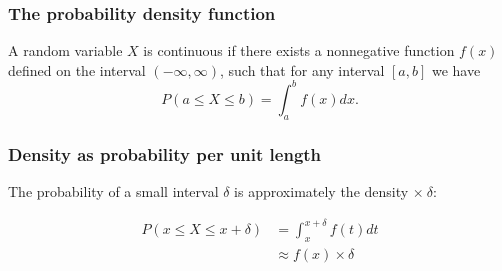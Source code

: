 \documentclass[10pt]{beamer}
\begin{document}
\begin{frame}
\frametitle{The probability density function}

\begin{definition} 
A random variable $X$ is continuous if there exists a nonnegative function $f(x)$ defined on the interval $(-\infty, \infty)$, such that for any interval $[a, b]$ we have 
\begin{equation*}
P(a \leq X \leq b) = \int_a^b f(x) dx.
\end{equation*} 
\end{definition}

\vspace{0.3cm}


\end{frame}

\begin{frame}
\frametitle{Density as probability per unit length}

The probability of a small interval $\delta$ is approximately the density
$\times \ \delta$:

\vspace{-0.3cm}

\begin{align*}
P(x \leq X \leq x + \delta) &= \int_x^{x+\delta} f(t) dt\\
& \approx f(x) \times \delta\\
\end{align*}

\vspace{-0.5cm}


\end{frame}
\end{document}
